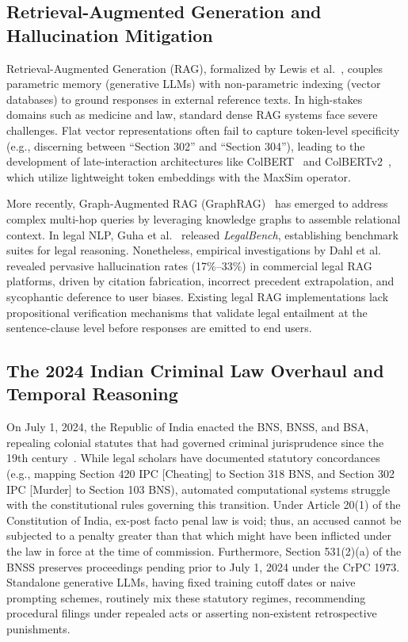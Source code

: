 \documentclass[conference]{IEEEtran}
\begin{document}
\subsection{Retrieval-Augmented Generation and Hallucination Mitigation}
Retrieval-Augmented Generation (RAG), formalized by Lewis et al.~\cite{lewis2020retrieval}, couples parametric memory (generative LLMs) with non-parametric indexing (vector databases) to ground responses in external reference texts. In high-stakes domains such as medicine and law, standard dense RAG systems face severe challenges. Flat vector representations often fail to capture token-level specificity (e.g., discerning between ``Section 302'' and ``Section 304''), leading to the development of late-interaction architectures like ColBERT~\cite{khattab2020colbert} and ColBERTv2~\cite{santhanam2022colbertv2}, which utilize lightweight token embeddings with the MaxSim operator.

More recently, Graph-Augmented RAG (GraphRAG)~\cite{edge2024graphrag} has emerged to address complex multi-hop queries by leveraging knowledge graphs to assemble relational context. In legal NLP, Guha et al.~\cite{guha2023legalbench} released \textit{LegalBench}, establishing benchmark suites for legal reasoning. Nonetheless, empirical investigations by Dahl et al.~\cite{dahl2024large} revealed pervasive hallucination rates (17\%--33\%) in commercial legal RAG platforms, driven by citation fabrication, incorrect precedent extrapolation, and sycophantic deference to user biases. Existing legal RAG implementations lack propositional verification mechanisms that validate legal entailment at the sentence-clause level before responses are emitted to end users.

\subsection{The 2024 Indian Criminal Law Overhaul and Temporal Reasoning}
On July 1, 2024, the Republic of India enacted the BNS, BNSS, and BSA, repealing colonial statutes that had governed criminal jurisprudence since the 19th century~\cite{bns2023, bnss2023, bsa2023}. While legal scholars have documented statutory concordances (e.g., mapping Section 420 IPC [Cheating] to Section 318 BNS, and Section 302 IPC [Murder] to Section 103 BNS), automated computational systems struggle with the constitutional rules governing this transition. Under Article 20(1) of the Constitution of India, ex-post facto penal law is void; thus, an accused cannot be subjected to a penalty greater than that which might have been inflicted under the law in force at the time of commission. Furthermore, Section 531(2)(a) of the BNSS preserves proceedings pending prior to July 1, 2024 under the CrPC 1973. Standalone generative LLMs, having fixed training cutoff dates or naive prompting schemes, routinely mix these statutory regimes, recommending procedural filings under repealed acts or asserting non-existent retrospective punishments.
\end{document}

